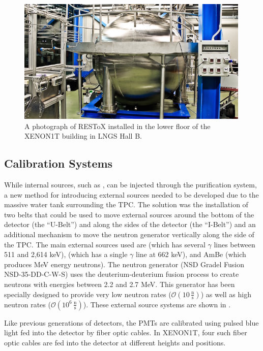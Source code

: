  \begin{figure}[t]
	\centering
	\includegraphics[width=0.99\textwidth]{xe1t_restox}
	\caption{A photograph of RESToX installed in the lower floor of the XENON1T building in LNGS Hall B.}
	\label{fig:xe1t_restox}
\end{figure}


  \subsection{Calibration Systems}
 \label{sec:xe1t_calibration_system}
 
While internal sources, such as , can be injected through the purification system, a new method for introducing external sources needed to be developed due to the massive water tank surrounding the TPC.  The solution was the installation of two belts that could be used to move external sources around the bottom of the detector (the ``U-Belt'') and along the sides of the detector (the ``I-Belt'') and an additional mechanism to move the neutron generator vertically along the side of the TPC.  The main external sources used are  (which has several $\gamma$ lines between 511 and 2,614 keV),  (which has a single $\gamma$ line at 662 keV), and AmBe (which produces MeV energy neutrons).  The neutron generator (NSD Gradel Fusion NSD-35-DD-C-W-S) uses the deuterium-deuterium fusion process to create neutrons with energies between 2.2 and 2.7 MeV.  This generator has been specially designed to provide very low neutron rates ($\mathcal{O} \left(10 \, \frac{\textrm{n}}{\textrm{s}} \right)$) as well as high neutron rates ($\mathcal{O} \left(10^6 \, \frac{\textrm{n}}{\textrm{s}} \right)$).  These external source systems are shown in .

Like previous generations of detectors, the PMTs are calibrated using pulsed blue light fed into the detector by fiber optic cables.  In XENON1T, four such fiber optic cables are fed into the detector at different heights and positions.


